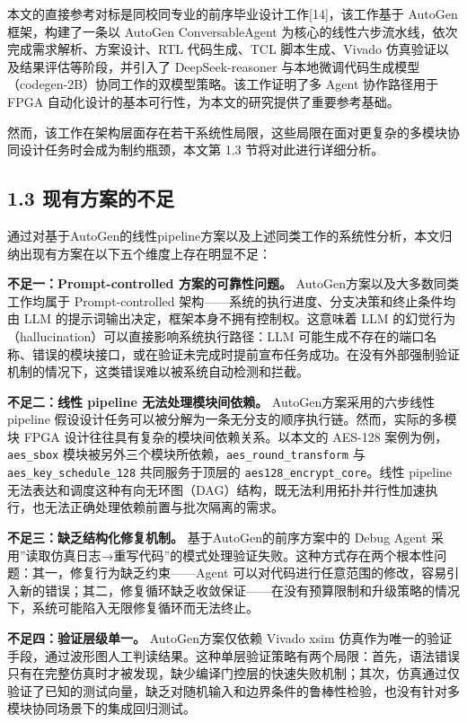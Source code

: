 本文的直接参考对标是同校同专业的前序毕业设计工作{[}14{]}，该工作基于
AutoGen 框架，构建了一条以 AutoGen ConversableAgent
为核心的线性六步流水线，依次完成需求解析、方案设计、RTL 代码生成、TCL
脚本生成、Vivado 仿真验证以及结果评估等阶段，并引入了 DeepSeek-reasoner
与本地微调代码生成模型（codegen-2B）协同工作的双模型策略。该工作证明了多
Agent 协作路径用于 FPGA
自动化设计的基本可行性，为本文的研究提供了重要参考基础。

然而，该工作在架构层面存在若干系统性局限，这些局限在面对更复杂的多模块协同设计任务时会成为制约瓶颈，本文第
1.3 节将对此进行详细分析。

\subsection{1.3
现有方案的不足}\label{ux73b0ux6709ux65b9ux6848ux7684ux4e0dux8db3}

通过对基于AutoGen的线性pipeline方案以及上述同类工作的系统性分析，本文归纳出现有方案在以下五个维度上存在明显不足：

\textbf{不足一：Prompt-controlled 方案的可靠性问题。}
AutoGen方案以及大多数同类工作均属于 Prompt-controlled
架构------系统的执行进度、分支决策和终止条件均由 LLM
的提示词输出决定，框架本身不拥有控制权。这意味着 LLM
的幻觉行为（hallucination）可以直接影响系统执行路径：LLM
可能生成不存在的端口名称、错误的模块接口，或在验证未完成时提前宣布任务成功。在没有外部强制验证机制的情况下，这类错误难以被系统自动检测和拦截。

\textbf{不足二：线性 pipeline 无法处理模块间依赖。}
AutoGen方案采用的六步线性 pipeline
假设设计任务可以被分解为一条无分支的顺序执行链。然而，实际的多模块 FPGA
设计往往具有复杂的模块间依赖关系。以本文的 AES-128
案例为例，\texttt{aes\_sbox}
模块被另外三个模块所依赖，\texttt{aes\_round\_transform} 与
\texttt{aes\_key\_schedule\_128} 共同服务于顶层的
\texttt{aes128\_encrypt\_core}。线性 pipeline
无法表达和调度这种有向无环图（DAG）结构，既无法利用拓扑并行性加速执行，也无法正确处理依赖前置与批次隔离的需求。

\textbf{不足三：缺乏结构化修复机制。} 基于AutoGen的前序方案中的 Debug
Agent
采用''读取仿真日志→重写代码''的模式处理验证失败。这种方式存在两个根本性问题：其一，修复行为缺乏约束------Agent
可以对代码进行任意范围的修改，容易引入新的错误；其二，修复循环缺乏收敛保证------在没有预算限制和升级策略的情况下，系统可能陷入无限修复循环而无法终止。

\textbf{不足四：验证层级单一。} AutoGen方案仅依赖 Vivado xsim
仿真作为唯一的验证手段，通过波形图人工判读结果。这种单层验证策略有两个局限：首先，语法错误只有在完整仿真时才被发现，缺少编译门控层的快速失败机制；其次，仿真通过仅验证了已知的测试向量，缺乏对随机输入和边界条件的鲁棒性检验，也没有针对多模块协同场景下的集成回归测试。

